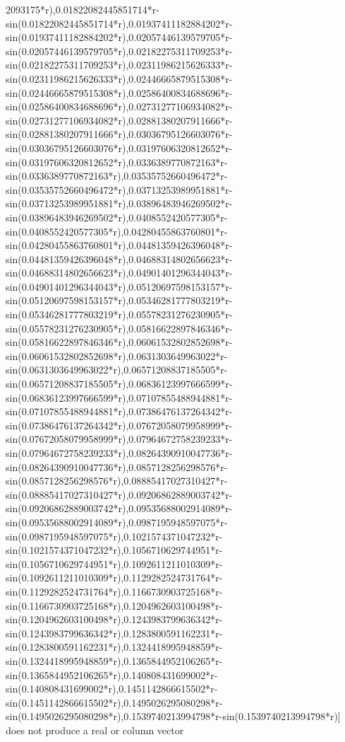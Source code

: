 \documentclass{article}
\begin{document}
\begin{eulernotebook}
\begin{eulercomment}
\begin{eulercomment}
\begin{eulercomment}
\begin{eulercomment}
\begin{euleroutput}
2093175*r),0.01822082445851714*r-sin(0.01822082445851714*r),0.01937411182884202*r-sin(0.01937411182884202*r),0.02057446139579705*r-sin(0.02057446139579705*r),0.02182275311709253*r-sin(0.02182275311709253*r),0.02311986215626333*r-sin(0.02311986215626333*r),0.02446665879515308*r-sin(0.02446665879515308*r),0.02586400834688696*r-sin(0.02586400834688696*r),0.02731277106934082*r-sin(0.02731277106934082*r),0.02881380207911666*r-sin(0.02881380207911666*r),0.03036795126603076*r-sin(0.03036795126603076*r),0.03197606320812652*r-sin(0.03197606320812652*r),0.0336389770872163*r-sin(0.0336389770872163*r),0.03535752660496472*r-sin(0.03535752660496472*r),0.03713253989951881*r-sin(0.03713253989951881*r),0.03896483946269502*r-sin(0.03896483946269502*r),0.0408552420577305*r-sin(0.0408552420577305*r),0.04280455863760801*r-sin(0.04280455863760801*r),0.04481359426396048*r-sin(0.04481359426396048*r),0.04688314802656623*r-sin(0.04688314802656623*r),0.04901401296344043*r-sin(0.04901401296344043*r),0.05120697598153157*r-sin(0.05120697598153157*r),0.05346281777803219*r-sin(0.05346281777803219*r),0.05578231276230905*r-sin(0.05578231276230905*r),0.05816622897846346*r-sin(0.05816622897846346*r),0.06061532802852698*r-sin(0.06061532802852698*r),0.0631303649963022*r-sin(0.0631303649963022*r),0.06571208837185505*r-sin(0.06571208837185505*r),0.06836123997666599*r-sin(0.06836123997666599*r),0.07107855488944881*r-sin(0.07107855488944881*r),0.07386476137264342*r-sin(0.07386476137264342*r),0.07672058079958999*r-sin(0.07672058079958999*r),0.07964672758239233*r-sin(0.07964672758239233*r),0.08264390910047736*r-sin(0.08264390910047736*r),0.0857128256298576*r-sin(0.0857128256298576*r),0.08885417027310427*r-sin(0.08885417027310427*r),0.09206862889003742*r-sin(0.09206862889003742*r),0.09535688002914089*r-sin(0.09535688002914089*r),0.0987195948597075*r-sin(0.0987195948597075*r),0.1021574371047232*r-sin(0.1021574371047232*r),0.1056710629744951*r-sin(0.1056710629744951*r),0.1092611211010309*r-sin(0.1092611211010309*r),0.1129282524731764*r-sin(0.1129282524731764*r),0.1166730903725168*r-sin(0.1166730903725168*r),0.1204962603100498*r-sin(0.1204962603100498*r),0.1243983799636342*r-sin(0.1243983799636342*r),0.1283800591162231*r-sin(0.1283800591162231*r),0.1324418995948859*r-sin(0.1324418995948859*r),0.1365844952106265*r-sin(0.1365844952106265*r),0.140808431699002*r-sin(0.140808431699002*r),0.1451142866615502*r-sin(0.1451142866615502*r),0.1495026295080298*r-sin(0.1495026295080298*r),0.1539740213994798*r-sin(0.1539740213994798*r)] does not produce a real or column vector
  

\end{euleroutput}
\end{eulercomment}
\end{eulercomment}
\end{eulercomment}
\end{eulercomment}
\end{eulernotebook}
\end{document}
